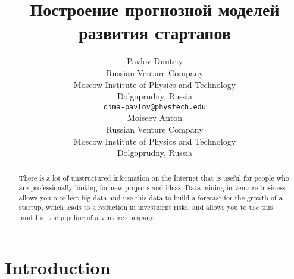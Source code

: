 \documentclass{article}
\title{Построение прогнозной моделей развития стартапов}
\author{ 
    Pavlov Dmitriy \\
	Russian Venture Company \\
	Moscow Institute of Physics and Technology\\
	Dolgoprudny, Russia \\
	\texttt{dima-pavlov@phystech.edu} \\
	\And
	Moiseev Anton \\
    Russian Venture Company \\
	Moscow Institute of Physics and Technology\\
	Dolgoprudny, Russia \\
}
\date{}
\begin{document}
\maketitle

\begin{abstract}
	There is a lot of unstructured information on the Internet that is useful for people who are professionally-looking for new projects and ideas. Data mining in venture business allows you o collect big data and use this data to build a forecast for the growth of a startup, which leads to a reduction in investment risks, and allows you to use this model in the pipeline of a venture company.
\end{abstract}


\section{Introduction}



\end{document}
